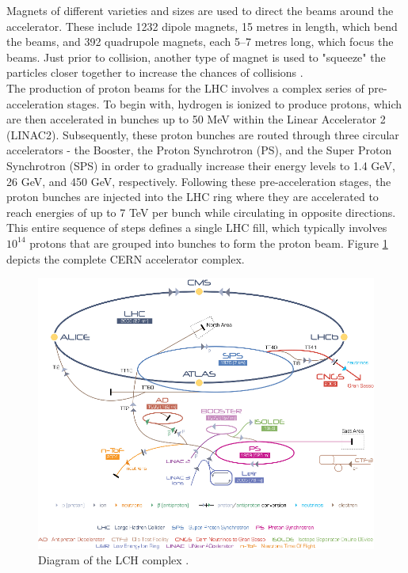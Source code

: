 Magnets of different varieties and sizes are used to direct the beams around the accelerator. These include 1232 dipole magnets, 15 metres in length, which bend the beams, and 392 quadrupole magnets, each 5–7 metres long, which focus the beams. Just prior to collision, another type of magnet is used to "squeeze" the particles closer together to increase the chances of collisions . \\

The production of proton beams for the LHC involves a complex series of pre-acceleration stages. To begin with, hydrogen is ionized to produce protons, which are then accelerated in bunches up to 50 MeV within the Linear Accelerator 2 (LINAC2). Subsequently, these proton bunches are routed through three circular accelerators - the Booster, the Proton Synchrotron (PS), and the Super Proton Synchrotron (SPS)  in order to gradually increase their energy levels to 1.4 GeV, 26 GeV, and 450 GeV, respectively. Following these pre-acceleration stages, the proton bunches are injected into the LHC ring where they are accelerated to reach energies of up to 7 TeV per bunch while circulating in opposite directions. This entire sequence of steps defines a single LHC fill, which typically involves $10^{14}$ protons that are grouped into bunches to form the proton beam. Figure \ref{lhc_com} depicts the complete CERN accelerator complex.

\begin{center}
  \begin{figure}[h]
    \centering
    \includegraphics[scale=.45]{Chapter1/lhc_complex_fig.png}
    \caption[LHC Complex]{Diagram of the LCH complex \cite{lhc_complex}.}
    \label{lhc_com}
  \end{figure}
\end{center}

